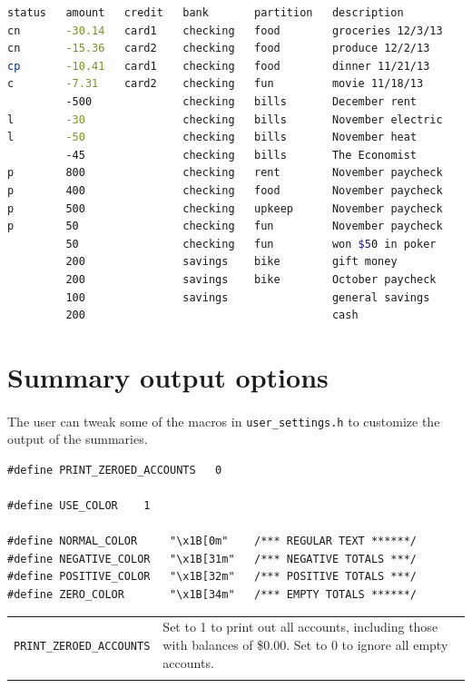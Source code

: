 \documentclass{article}
\begin{document}
\begin{flushleft}
\begin{lstlisting}[language=bash]
status   amount   credit   bank       partition   description
cn       -30.14   card1    checking   food        groceries 12/3/13
cn       -15.36   card2    checking   food        produce 12/2/13
cp       -10.41   card1    checking   food        dinner 11/21/13
c        -7.31    card2    checking   fun         movie 11/18/13
         -500              checking   bills       December rent
l        -30               checking   bills       November electric
l        -50               checking   bills       November heat
         -45               checking   bills       The Economist
p        800               checking   rent        November paycheck		
p        400               checking   food        November paycheck	
p        500               checking   upkeep      November paycheck		
p        50                checking   fun         November paycheck	
         50                checking   fun         won $50 in poker		
         200               savings    bike        gift money
         200               savings    bike        October paycheck
         100               savings                general savings
         200                                      cash
\end{lstlisting}




\section{Summary output options}

\paragraph{} The user can tweak some of the macros in {\tt user\_settings.h} to customize the output of the summaries.

\begin{lstlisting}
#define PRINT_ZEROED_ACCOUNTS   0

#define USE_COLOR    1

#define NORMAL_COLOR     "\x1B[0m"    /*** REGULAR TEXT ******/
#define NEGATIVE_COLOR   "\x1B[31m"   /*** NEGATIVE TOTALS ***/
#define POSITIVE_COLOR   "\x1B[32m"   /*** POSITIVE TOTALS ***/
#define ZERO_COLOR       "\x1B[34m"   /*** EMPTY TOTALS ******/
\end{lstlisting}


\begin{center}
\begin{tabular}{lp{11cm}}
{\tt PRINT\_ZEROED\_ACCOUNTS} & Set to 1 to print out all accounts, including those with balances of \$0.00. Set to 0 to ignore all empty accounts. \\ \\


\end{tabular}
\end{center}
\end{flushleft}
\end{document}
